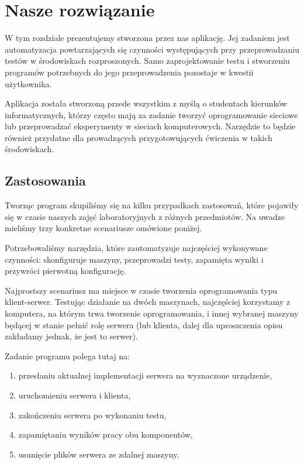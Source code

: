 \documentclass[00-praca-magisterska.tex]{subfiles}
\begin{document}
\chapter{Nasze rozwiązanie}

W tym rozdziale prezentujemy stworzona przez nas aplikację. Jej zadaniem jest
automatyzacja powtarzających się czynności występujących przy przeprowadzaniu
testów w środowiskach rozproszonych. Samo zaprojektowanie testu i stworzeniu
programów potrzebnych do jego przeprowadzenia pozostaje w kwestii użytkownika.

Aplikacja została stworzoną przede wszystkim z myślą o studentach kierunków
informatycznych, którzy często mają za zadanie tworzyć oprogramowanie sieciowe
lub przeprowadzać eksperymenty w sieciach komputerowych. Narzędzie to będzie
również przydatne dla prowadzących przygotowujących ćwiczenia w takich
środowiskach.

\section{Zastosowania}

Tworząc program skupiliśmy się na kilku przypadkach zastosowań, które pojawiły
się w czasie naszych zajęć laboratoryjnych z różnych przedmiotów. Na uwadze
mieliśmy trzy konkretne scenariusze omówione poniżej.

Potrzebowaliśmy narzędzia, które zautomatyzuje najczęściej wykonywane
czynności: skonfiguruje maszyny, przeprowadzi testy, zapamięta wyniki i
przywróci pierwotną konfigurację.

Najprostszy scenariusz ma miejsce w czasie tworzenia oprogramowania typu
klient-serwer. Testując działanie na dwóch maszynach, najczęściej korzystamy z
komputera, na którym trwa tworzenie oprogramowania, i innej wybranej maszyny
będącej w stanie pełnić rolę serwera (lub klienta, dalej dla uproszczenia opisu
zakładamy jednak, że jest to serwer).

Zadanie programu polega tutaj na:
\begin{enumerate}
\item przesłaniu aktualnej implementacji serwera na wyznaczone urządzenie,
\item uruchomieniu serwera i klienta,
\item zakończeniu serwera po wykonaniu testu,
\item zapamiętaniu wyników pracy obu komponentów,
\item usunięcie plików serwera ze zdalnej maszyny.
\end{enumerate}
\end{document}
